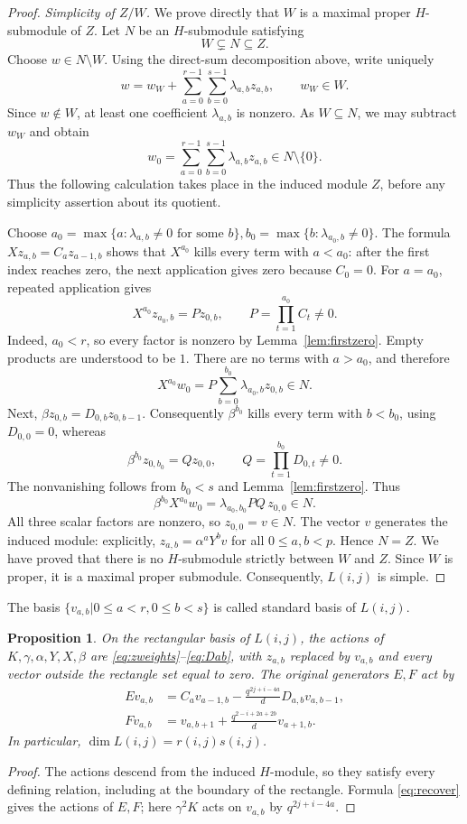 \documentclass[10pt,oneside]{amsart}
\newtheorem{proposition}{Proposition}[section]
\theoremstyle{definition}
\def\<{\leqslant}
\begin{document}
\begin{proof}
\smallskip\noindent\emph{ Simplicity of $Z/W$.}
We prove directly that $W$ is a maximal proper $H$-submodule of $Z$.
Let $N$ be an $H$-submodule satisfying
\[
 W\subsetneq N\subseteq Z.
\]
Choose $w\in N\setminus W$. Using the direct-sum decomposition
above, write uniquely
\[
 w=w_W+\sum_{a=0}^{r-1}\sum_{b=0}^{s-1}\lambda_{a,b}z_{a,b},
 \qquad w_W\in W.
\]
Since $w\notin W$, at least one coefficient $\lambda_{a,b}$ is
nonzero. As $W\subseteq N$, we may subtract $w_W$ and obtain
\[
 w_0=\sum_{a=0}^{r-1}\sum_{b=0}^{s-1}
                  \lambda_{a,b}z_{a,b}\in N\setminus\{0\}.
\]
Thus the following calculation takes place in the induced module
$Z$, before any simplicity assertion about its quotient.

Choose
 $a_0=\max\{a:\lambda_{a,b}\ne0\text{ for some }b\},
 b_0=\max\{b:\lambda_{a_0,b}\ne0\}.$
The formula $Xz_{a,b}=C_az_{a-1,b}$ shows that $X^{a_0}$ kills
every term with $a<a_0$: after the first index reaches zero,
the next application gives zero because $C_0=0$. For $a=a_0$,
repeated application gives
\[
 X^{a_0}z_{a_0,b}=Pz_{0,b},\qquad
 P=\prod_{t=1}^{a_0}C_t\ne0.
\]
Indeed, $a_0<r$, so every factor is nonzero by
Lemma~\ref{lem:firstzero}. Empty products are understood to be $1$.
There are no terms with $a>a_0$, and therefore
\[
 X^{a_0}w_0=P\sum_{b=0}^{b_0}\lambda_{a_0,b}z_{0,b}\in N.
\]
Next, $\beta z_{0,b}=D_{0,b}z_{0,b-1}$. Consequently
$\beta^{b_0}$ kills every term with $b<b_0$, using $D_{0,0}=0$,
whereas
\[
 \beta^{b_0}z_{0,b_0}=Qz_{0,0},\qquad
 Q=\prod_{t=1}^{b_0}D_{0,t}\ne0.
\]
The nonvanishing follows from $b_0<s$ and
Lemma~\ref{lem:firstzero}. Thus
\[
 \beta^{b_0}X^{a_0}w_0
   =\lambda_{a_0,b_0}PQ\,z_{0,0}\in N.
\]
All three scalar factors are nonzero, so $z_{0,0}=v\in N$.
The vector $v$ generates the induced module: explicitly,
$z_{a,b}=\alpha^aY^bv$ for all $0\le a,b<p$. Hence $N=Z$.
We have proved that there is no $H$-submodule strictly between
$W$ and $Z$. Since $W$ is proper, it is a maximal proper submodule.
Consequently, $L(i,j)$ is simple.
\end{proof}
The basis $\{v_{a,b}|0\<a<r,0\<b<s\}$ is called standard basis of $L(i,j)$.
\begin{proposition}\label{prop:explicit}
On the rectangular basis of $L(i,j)$, the actions of $K,\gamma,\alpha,Y,X,\beta$ are \eqref{eq:zweights}--\eqref{eq:Dab}, with $z_{a,b}$ replaced by $v_{a,b}$ and every vector outside the rectangle set equal to zero. The original generators $E,F$ act by
\begin{align}
 Ev_{a,b}&=C_av_{a-1,b}
 -\frac{q^{2j+i-4a}}dD_{a,b}v_{a,b-1},\label{eq:explicitE}\\
 Fv_{a,b}&=v_{a,b+1}+\frac{q^{2-i+2a+2b}}d v_{a+1,b}.
 \label{eq:explicitF}
\end{align}
In particular, $\dim L(i,j)=r(i,j)s(i,j)$.
\end{proposition}
\begin{proof}
The actions descend from the induced $H$-module, so they satisfy every defining relation, including at the boundary of the rectangle. Formula \eqref{eq:recover} gives the actions of $E,F$; here $\gamma^2K$ acts on $v_{a,b}$ by $q^{2j+i-4a}$.
\end{proof}
\end{document}
